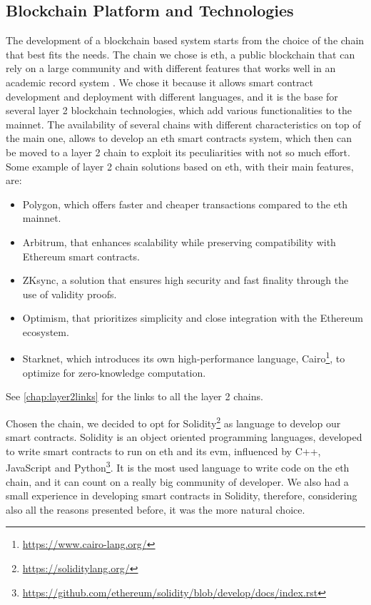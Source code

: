 \subsection{Blockchain Platform and Technologies}
The development of a blockchain based system starts from the choice of the chain that best fits the needs. The chain we chose is \acrlong{eth}, a public blockchain that can rely on a large community and with different features that works well in an academic record system \cite{mustafa2024publiceduchain}\cite{yassynzhanbolatzhan2021verificationuniversitystudent}. We chose it because it allows smart contract development and deployment with different languages, and it is the base for several layer 2 blockchain technologies, which add various functionalities to the mainnet. The availability of several chains with different characteristics on top of the main one, allows to develop an \acrlong{eth} smart contracts system, which then can be moved to a layer 2 chain to exploit its peculiarities with not so much effort. Some example of layer 2 chain solutions based on \acrlong{eth}, with their main features, are:

\begin{itemize}
    \item Polygon, which offers faster and cheaper transactions compared to the \acrlong{eth} mainnet.
    \item Arbitrum, that enhances scalability while preserving compatibility with Ethereum smart contracts.
    \item ZKsync, a solution that ensures high security and fast finality through the use of validity proofs.
    \item Optimism, that prioritizes simplicity and close integration with the Ethereum ecosystem.
    \item Starknet, which introduces its own high-performance language, Cairo\footnote{\url{https://www.cairo-lang.org/}}, to optimize for zero-knowledge computation.
\end{itemize}
See \cref{chap:layer2links} for the links to all the layer 2 chains.

Chosen the chain, we decided to opt for Solidity\footnote{\url{https://soliditylang.org/}} as language to develop our smart contracts. Solidity is an object oriented programming languages, developed to write smart contracts to run on \acrlong{eth} and its \acrshort{evm}, influenced by C++, JavaScript and Python\footnote{\url{https://github.com/ethereum/solidity/blob/develop/docs/index.rst}}. It is the most used language to write code on the \acrlong{eth} chain, and it can count on a really big community of developer. We also had a small experience in developing smart contracts in Solidity, therefore, considering also all the reasons presented before, it was the more natural choice.

